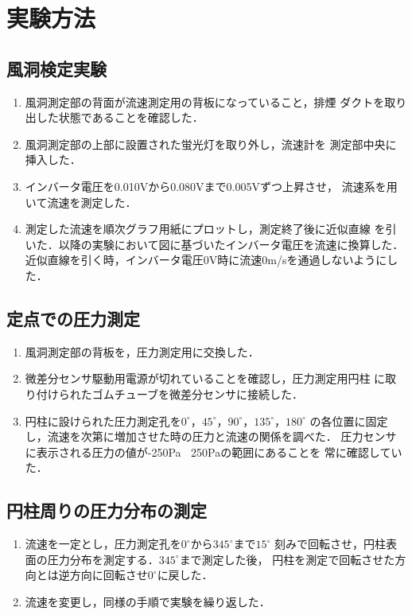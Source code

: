 \documentclass[twocolumn,10pt,a4j]{jsarticle}
\begin{document}
\section{実験方法}
  \subsection{風洞検定実験}
    \begin{enumerate}
      \item 風洞測定部の背面が流速測定用の背板になっていること，排煙
      ダクトを取り出した状態であることを確認した．
      \item 風洞測定部の上部に設置された蛍光灯を取り外し，流速計を
      測定部中央に挿入した．
      \item インバータ電圧を0.010Vから0.080Vまで0.005Vずつ上昇させ，
      流速系を用いて流速を測定した．
      \item 測定した流速を順次グラフ用紙にプロットし，測定終了後に近似直線
      を引いた．以降の実験において図に基づいたインバータ電圧を流速に換算した．
      近似直線を引く時，インバータ電圧0V時に流速0m/sを通過しないようにした．
    \end{enumerate}
  \subsection{定点での圧力測定}
    \begin{enumerate}
      \item 風洞測定部の背板を，圧力測定用に交換した．
      \item 微差分センサ駆動用電源が切れていることを確認し，圧力測定用円柱
      に取り付けられたゴムチューブを微差分センサに接続した．
      \item 円柱に設けられた圧力測定孔を$0^\circ， 45^\circ， 90^\circ， 135^\circ， 180^\circ$
      の各位置に固定し，流速を次第に増加させた時の圧力と流速の関係を調べた．
      圧力センサに表示される圧力の値が-250Pa $~$ 250Paの範囲にあることを
      常に確認していた．
    \end{enumerate}
  \subsection{円柱周りの圧力分布の測定}
    \begin{enumerate}
      \item 流速を一定とし，圧力測定孔を$0^\circ$から$345^\circ$まで$15^\circ$
      刻みで回転させ，円柱表面の圧力分布を測定する．$345^\circ$まで測定した後，
      円柱を測定で回転させた方向とは逆方向に回転させ$0^\circ$に戻した．
      \item 流速を変更し，同様の手順で実験を繰り返した．
    \end{enumerate}
\end{document}
